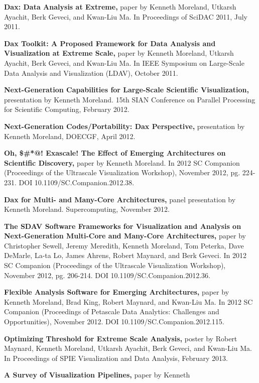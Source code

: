 \begin{description}
  \raggedright
\item\textbf{Dax: Data Analysis at Extreme,} paper by Kenneth Moreland,
  Utkarsh Ayachit, Berk Geveci, and Kwan-Liu Ma. In Proceedings of SciDAC
  2011, July 2011.
\item\textbf{Dax Toolkit: A Proposed Framework for Data Analysis and
  Visualization at Extreme Scale,} paper by Kenneth Moreland, Utkarsh
  Ayachit, Berk Geveci, and Kwan-Liu Ma. In IEEE Symposium on Large-Scale
  Data Analysis and Visualization (LDAV), October 2011.
\item\textbf{Next-Generation Capabilities for Large-Scale Scientific
  Visualization,} presentation by Kenneth Moreland. 15th SIAN Conference on
  Parallel Processing for Scientific Computing, February 2012.
\item\textbf{Next-Generation Codes/Portability: Dax Perspective,}
  presentation by Kenneth Moreland, DOECGF, April 2012.
\item\textbf{Oh, \$\#*@! Exascale! The Effect of Emerging Architectures on
  Scientific Discovery,} paper by Kenneth Moreland. In 2012 SC Companion
  (Proceedings of the Ultrascale Visualization Workshop), November 2012,
  pg. 224-231. DOI 10.1109/SC.Companion.2012.38.
\item\textbf{Dax for Multi- and Many-Core Architectures,} panel
  presentation by Kenneth Moreland. Supercomputing, November 2012.
\item\textbf{The SDAV Software Frameworks for Visualization and Analysis on
  Next-Generation Multi-Core and Many-Core Architectures,} paper by
  Christopher Sewell, Jeremy Meredith, Kenneth Moreland, Tom Peterka, Dave
  DeMarle, La-ta Lo, James Ahrens, Robert Maynard, and Berk Geveci. In 2012
  SC Companion (Proceedings of the Ultrascale Visualization Workshop),
  November 2012, pg. 206-214. DOI 10.1109/SC.Companion.2012.36.
\item\textbf{Flexible Analysis Software for Emerging Architectures,} paper
  by Kenneth Moreland, Brad King, Robert Maynard, and Kwan-Liu Ma. In 2012
  SC Companion (Proceedings of Petascale Data Analytics: Challenges and
  Opportunities), November 2012. DOI 10.1109/SC.Companion.2012.115.
\item\textbf{Optimizing Threshold for Extreme Scale Analysis,} poster by
  Robert Maynard, Kenneth Moreland, Utkarsh Ayachit, Berk Geveci, and
  Kwan-Liu Ma. In Proceedings of SPIE Visualization and Data Analysis,
  February 2013.
\item\textbf{A Survey of Visualization Pipelines,} paper by Kenneth

\end{description}
